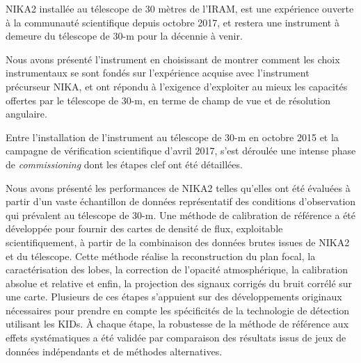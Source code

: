 %
%
%
NIKA2 installée au télescope de 30 mètres de l'IRAM, est une expérience ouverte à la communauté scientifique depuis octobre 2017, et restera une instrument à demeure du télescope de 30-m pour la décennie à venir.

Nous avons présenté l'instrument en choisissant de montrer comment les choix instrumentaux se sont fondés sur l'expérience acquise avec l'instrument précurseur NIKA, et ont répondu à l'exigence d'exploiter au mieux les capacités offertes par le télescope de 30-m, en terme de champ de vue et de résolution angulaire. 

Entre l'installation de l'instrument au télescope de 30-m en octobre 2015 et la campagne de vérification scientifique d'avril 2017, s'est déroulée une intense phase de \emph{commissioning} dont les étapes clef ont été détaillées. 

Nous avons présenté les performances de NIKA2 telles qu'elles ont été évaluées à partir d'un vaste échantillon de données représentatif des conditions d'observation qui prévalent au télescope de 30-m. Une méthode de calibration de référence a été développée pour fournir des cartes de densité de flux, exploitable scientifiquement, à partir de la combinaison des données brutes issues de NIKA2 et du télescope. Cette méthode réalise la reconstruction du plan focal, la caractérisation des lobes, la correction de l'opacité atmosphérique, la calibration absolue et relative et enfin, la projection des signaux corrigés du bruit corrélé sur une carte. Plusieurs de ces étapes s'appuient sur des développements originaux nécessaires pour prendre en compte les spécificités de la technologie de détection utilisant les KIDs. \`A chaque étape, la robustesse de la méthode de référence aux effets systématiques a été validée par comparaison des résultats issus de jeux de données indépendants et de méthodes alternatives.


